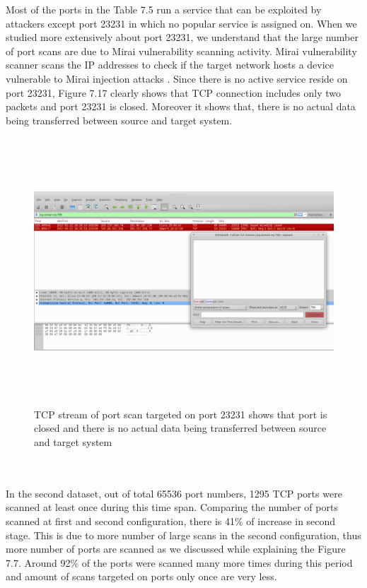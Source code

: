 Most of the ports in the Table 7.5 run a service that can be exploited by attackers except port 23231 in which no popular service is assigned on.
When we studied more extensively about port 23231, we understand that the large number of port scans are due to Mirai vulnerability scanning activity.
Mirai vulnerability scanner scans the IP addresses to check if the target network hosts a device vulnerable to Mirai injection attacks \cite{hallman2017ioddos}.
Since there is no active service reside on port 23231, Figure 7.17 clearly shows that TCP connection includes only two packets and port 23231 is closed.
Moreover it shows that, there is no actual data being transferred between source and target system. 
\begin{figure}[ht]
\centering
\includegraphics[width=16cm, height=10cm]{images/23231port.png}
\caption{TCP stream of port scan targeted on port 23231 shows that port is closed and there is no actual data being transferred between source and target system }
\end{figure}
\\\\
In the second dataset, out of total 65536 port numbers, 1295 TCP ports were scanned at least once during this time span.
Comparing the number of ports scanned at first and second configuration, there is 41\% of increase in second stage.
This is due to more number of large scans in the second configuration, thus more number of ports are scanned as we discussed while explaining the Figure 7.7.
Around 92\% of the ports were scanned many more times during this period and amount of scans targeted on ports only once are very less. 
